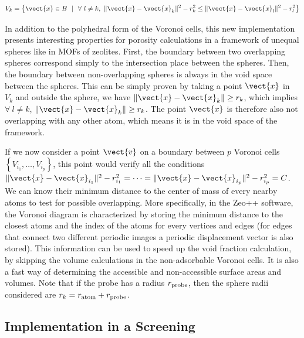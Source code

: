 \documentclass[main]{subfiles}
\begin{document}
\begin{equation}\label{eq:r_voronoi_radical}
    V_{k} = \left\{\vect{x} \in B\ \ |\ \ \forall\ l\neq k,\ \lVert \vect{x}-\vect{x}_k \rVert^2 - r_k^2 \leq \lVert \vect{x}-\vect{x}_l \rVert^2 - r_l^2 \right\}
  \end{equation}

In addition to the polyhedral form of the Voronoi cells, this new implementation presents interesting properties for porosity calculations in a framework of unequal spheres like in MOFs of zeolites.\cite{voronoi_radical} First, the boundary between two overlapping spheres correspond simply to the intersection place between the spheres. Then, the boundary between non-overlapping spheres is always in the void space between the spheres. This can be simply proven by taking a point $\vect{x}$ in $V_{k}$ and outside the sphere, we have $\lVert \vect{x}-\vect{x}_k \rVert \geq r_k$, which implies $\forall\ l\neq k$, $\lVert \vect{x}-\vect{x}_k \rVert \geq r_k$. The point $\vect{x}$ is therefore also not overlapping with any other atom, which means it is in the void space of the framework. 

If we now consider a point $\vect{v}$ on a boundary between $p$ Voronoi cells $\left\{V_{i_1},\ldots,V_{i_p}\right\}$, this point would verify all the conditions $\lVert \vect{x}-\vect{x}_{i_1} \rVert^2 - r_{i_1}^2 = \cdots = \lVert \vect{x}-\vect{x}_{i_p} \rVert^2 - r_{i_p}^2 = C$. We can know their minimum distance to the center of mass of every nearby atoms to test for possible overlapping. More specifically, in the Zeo++ software,\cite{Zeo++} the Voronoi diagram is characterized by storing the minimum distance to the closest atoms and the index of the atoms for every vertices and edges (for edges that connect two different periodic images a periodic displacement vector is also stored). This information can be used to speed up the void fraction calculation, by skipping the volume calculations in the non-adsorbable Voronoi cells. It is also a fast way of determining the accessible and non-accessible surface areas and volumes.\cite{Zeo++} Note that if the probe has a radius $r_{\text{probe}}$, then the sphere radii considered are $r_k = r_{\text{atom}}+r_{\text{probe}}$.

\subsection{Implementation in a Screening}
\end{document}
